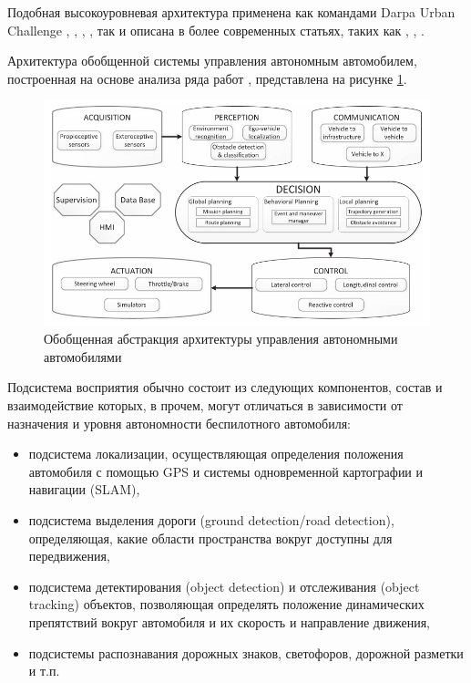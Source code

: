 Подобная высокоуровневая архитектура применена как командами Darpa Urban Challenge \cite{darpa_junior}, \cite{darpa_mit},
\cite{darpa_boss}, \cite{darpa_annieway}, так и описана в более современных статьях,
таких как \cite{developing_car_1}, \cite{car_proud}, \cite{car_race}.

Архитектура обобщенной системы управления автономным автомобилем, построенная на основе анализа ряда
работ \cite{motion_planning_review}, представлена на рисунке \ref{img:general_arch}.

\begin{figure}[h]
    \centering
    \includegraphics[width=\linewidth]{images/general_arch}
    \caption{Обобщенная абстракция архитектуры управления автономными автомобилями \cite{motion_planning_review}}
    \label{img:general_arch}
\end{figure}

Подсистема восприятия обычно состоит из следующих компонентов, состав и взаимодействие которых, в прочем, могут
отличаться в зависимости от назначения и уровня автономности беспилотного автомобиля:
\begin{itemize}
    \item подсистема локализации, осуществляющая определения положения автомобиля с помощью GPS и системы одновременной
          картографии и навигации (SLAM),
    \item подсистема выделения дороги (ground detection/road detection), определяющая, какие области пространства вокруг
          доступны для передвижения,
    \item подсистема детектирования (object detection)  и отслеживания (object tracking) объектов, позволяющая определять
          положение динамических препятствий вокруг автомобиля и их скорость и направление движения,
    \item подсистемы распознавания дорожных знаков, светофоров, дорожной разметки и т.п.
\end{itemize}

